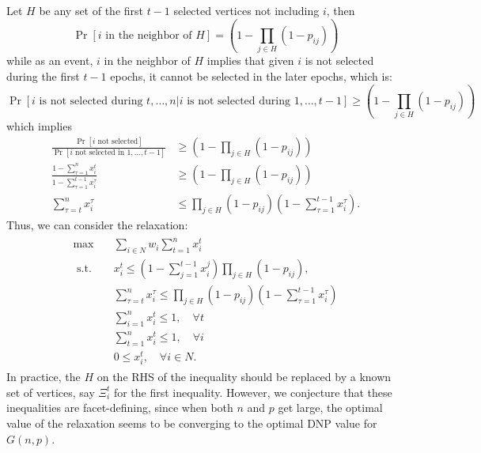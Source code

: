 \documentclass[10pt,leqno]{amsart}
\begin{document}
Let $H$ be any set of the first $t-1$ selected vertices not including $i$, then
\[\Pr[\text{$i$ in the neighbor of $H$}]=\left(1-\prod_{j\in H}(1-p_{ij})\right)\]
while as an event, $i$ in the neighbor of $H$ implies that given $i$ is not selected during the first $t-1$ epochs, it cannot be selected in the later epochs, which is:
\[\Pr[\text{$i$ is not selected during $t,\ldots,n$}|\text{$i$ is not selected during $1,\ldots,t-1$}]\geq \left(1-\prod_{j\in H}(1-p_{ij})\right)\]
which implies
\begin{align*}
  \frac{\Pr[\text{$i$ not selected}]}{\Pr[\text{$i$ not selected in $1,\ldots,t-1$}]}&\geq\left(1-\prod_{j\in H}(1-p_{ij})\right)\\
  \frac{1-\sum_{\tau=1}^{n}x_i^t}{1-\sum_{\tau=1}^{t-1}x_i^\tau}&\geq \left(1-\prod_{j\in H}(1-p_{ij})\right)\\
  \sum_{\tau=t}^{n}x_i^\tau&\leq \prod_{j\in H}(1-p_{ij})\left(1-\sum_{\tau=1}^{t-1}x_i^\tau\right).
\end{align*}
Thus, we can consider the relaxation:
\begin{align*}
  \begin{split}
    \max\quad &\sum_{i\in N}w_i\sum_{t=1}^{n}x^t_i\\
    \text{ s.t. }
    &x_i^t\leq \left(1-\sum_{j=1}^{t-1}x_i^j\right)\prod_{j\in H}(1-p_{ij}),\\
    &\sum_{\tau=t}^{n}x_i^\tau\leq \prod_{j\in H}(1-p_{ij})\left(1-\sum_{\tau=1}^{t-1}x_i^\tau\right)\\
    &\sum_{i=1}^{n}x_i^t\leq1,\quad\forall t\\
    &\sum_{t=1}^{n}x_i^t\leq1,\quad\forall i\\
    &0\leq x^t_i,\quad \forall i\in N.
  \end{split}
\end{align*}
In practice, the $H$ on the RHS of the inequality should be replaced by a known set of vertices, say $\Xi_i^t$ for the first inequality.
However, we conjecture that these inequalities are facet-defining, since when both $n$ and $p$ get large, the optimal value of the relaxation seems to be converging to the optimal DNP value for $G(n,p)$.
\end{document}
